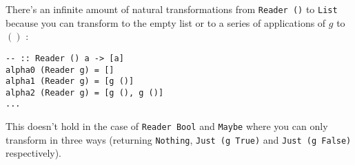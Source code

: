 \documentclass[]{article}
\newcommand{\fakesection}[1]{
	\section*{#1}
	\par\refstepcounter{section}
	\addcontentsline{toc}{section}{#1}
}
\begin{document}
There's an infinite amount of natural transformations from \texttt{Reader ()} to \texttt{List} because you can transform to the empty list or to a series of applications of $g$ to $()$ :

\begin{verbatim}
-- :: Reader () a -> [a]
alpha0 (Reader g) = []
alpha1 (Reader g) = [g ()]
alpha2 (Reader g) = [g (), g ()]
...
\end{verbatim}

\noindent This doesn't hold in the case of \texttt{Reader Bool} and \texttt{Maybe} where you can only transform in three ways (returning \texttt{Nothing}, \texttt{Just (g True)} and \texttt{Just (g False)} respectively).

%
%



\end{document}
